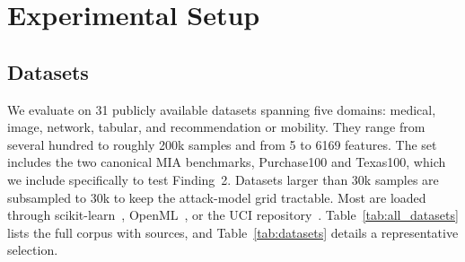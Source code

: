 \section{Experimental Setup}
\label{sec:setup}

\subsection{Datasets}

We evaluate on 31 publicly available datasets spanning five domains: medical,
image, network, tabular, and recommendation or mobility. They range from
several hundred to roughly 200k samples and from 5 to 6169 features. The set
includes the two canonical MIA benchmarks, Purchase100 and Texas100, which
we include specifically to test Finding~2. Datasets larger than 30k samples
are subsampled to 30k to keep the attack-model grid tractable. Most are
loaded through scikit-learn~\cite{pedregosa2011scikit},
OpenML~\cite{vanschoren2014openml}, or the UCI
repository~\cite{dua2019uci}. Table~\ref{tab:all_datasets} lists the
full corpus with sources, and Table~\ref{tab:datasets} details a
representative selection.

